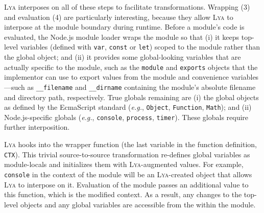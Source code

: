 \documentclass[letterpaper,twocolumn,10pt]{article}
\def\eg{{\em e.g.}, }
\def\etc{{\em etc.}\xspace}
\newcommand{\ttt}[1]{\texttt{#1}}
\newcommand{\sys}{{\scshape Lya}\xspace}
\begin{document}
\sys interposes on all of these steps to facilitate transformations.
Wrapping (3) and evaluation (4) are particularly interesting, because they allow \sys to interpose at the module boundary during runtime.
Before a module's code is evaluated, the Node.js module loader wraps the module so that
  (i) it keeps top-level variables (defined with \ttt{var}, \ttt{const} or \ttt{let}) scoped to the module rather than the global object; and
  (ii) it provides some global-looking variables that are actually specific to the module, such as the \ttt{module} and \ttt{exports} objects that the implementor can use to export values from the module and convenience variables---such as \ttt{\_\_filename} and \ttt{\_\_dirname}  containing the module's absolute filename and directory path, respectively.
True globals remaining are
  (i) the global objects as defined by the EcmaScript standard (\eg \ttt{Object}, \ttt{Function}, \ttt{Math}); and
  (ii) Node.js-specific globals (\eg \ttt{console}, \ttt{process}, \ttt{timer}).
These globals require further interposition.



\sys hooks into the wrapper function (the last variable in the function definition, \ttt{CTX}).
This trivial source-to-source transformation re-defines global variables as module-locals and initializes them with \sys-augmented values.
For example, \ttt{console} in the context of the module will be an \sys-created object that allows \sys to interpose on it.
Evaluation of the module passes an additional value to this function, which is the modified context.
As a result, any changes to the top-level objects and any global variables are accessible from the within the module.

\end{document}
